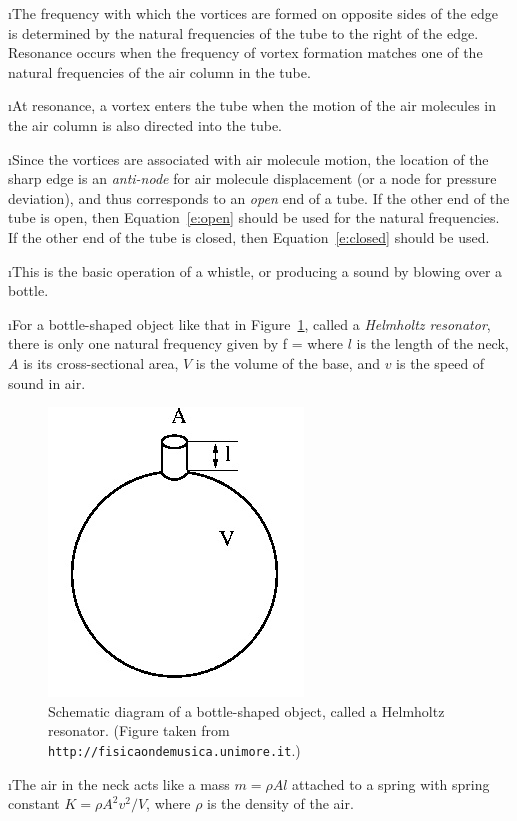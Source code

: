 \i The frequency with which the vortices
are formed on opposite sides of the edge
is determined by the natural frequencies of 
the tube to the right of the edge.
Resonance occurs when the frequency of 
vortex formation matches one of the natural 
frequencies of the air column in the tube.

\i At resonance, a vortex enters the tube 
when the motion of the air molecules in the air 
column is also directed into the tube.

\i Since the vortices are associated with
air molecule motion, the location of the 
sharp edge is an {\em anti-node} for air molecule 
displacement (or a node for pressure deviation), 
and thus corresponds to an {\em open} end of a tube.
If the other end of the tube is open, 
then Equation~\ref{e:open} 
should be used for the natural frequencies.
If the other end of the tube is closed, 
then Equation~\ref{e:closed} should be used.

\i This is the basic operation of a 
whistle, or producing a sound by blowing
over a bottle.

\i \ex For a bottle-shaped object like that in 
Figure~\ref{f:helmholtzresonator},
called a {\em Helmholtz resonator},
there is only one natural frequency given by
%
\be
f = 
\ee
%
where $l$ is the length of the neck, $A$ is its
cross-sectional area, $V$ is the volume of 
the base, and $v$ is the speed of sound in air.
%
\begin{figure}[htbp]
\begin{center}
\includegraphics[width=.3\textwidth]{helmholtzresonator.jpg}
\caption{Schematic diagram of a bottle-shaped object, 
called a Helmholtz resonator.
(Figure taken from {\tt http://fisicaondemusica.unimore.it}.)}
\label{f:helmholtzresonator}
\end{center}
\end{figure}

\i The air in the neck acts like a mass 
$m = \rho A l$ attached to a spring with spring constant
$K = {\rho A^2 v^2}/{V}$, where $\rho$ is the density
of the air.

